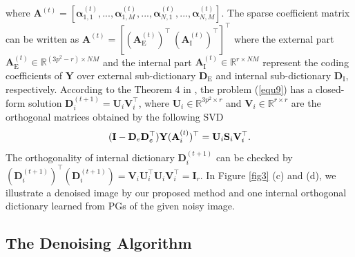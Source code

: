 \documentclass[10pt,twocolumn,letterpaper]{article}
\begin{document}
where $\textbf{A}^{(t)}=[\bm{\alpha}_{1,1}^{(t)},...,\bm{\alpha}_{1,M}^{(t)},...,\bm{\alpha}_{N,1}^{(t)},...,\bm{\alpha}_{N,M}^{(t)}]$. The sparse coefficient matrix can be written as $\mathbf{A}^{(t)}=[(\mathbf{A}_{\text{E}}^{(t)})^{\top}\ (\mathbf{A}_{\text{I}}^{(t)})^{\top}]^{\top}$ where the external part $\mathbf{A}_{\text{E}}^{(t)}\in\mathbb{R}^{(3p^2-r)\times NM}$ and the internal part $\mathbf{A}_{\text{I}}^{(t)}\in\mathbb{R}^{r\times NM}$ represent the coding coefficients of $\mathbf{Y}$ over external sub-dictionary $\mathbf{D}_{\text{E}}$ and internal sub-dictionary $\mathbf{D}_{\text{I}}$, respectively. According to the Theorem 4 in \cite{spca}, the problem (\ref{equ9}) has a closed-form solution $\mathbf{D}_{i}^{(t+1)}=\mathbf{U}_{i}\mathbf{V}_{i}^{\top}$, where $\mathbf{U}_{i}\in\mathbb{R}^{3p^2\times r}$ and $\mathbf{V}_{i}\in\mathbb{R}^{r\times r}$ are the orthogonal matrices obtained by the following SVD
\vspace{-1mm}
\begin{equation}\label{equ10}\vspace{-2mm}
(\mathbf{I}-\mathbf{D}_{e}\mathbf{D}_{e}^{\top})\mathbf{Y}(\mathbf{A}_{i}^{(t)})^{\top}
=
\mathbf{U}_{i}\mathbf{S}_{i}\mathbf{V}_{i}^{\top}.
\end{equation}
The orthogonality of internal dictionary $\mathbf{D}_{i}^{(t+1)}$ can be checked by 
$(\mathbf{D}_{i}^{(t+1)})^{\top}(\mathbf{D}_{i}^{(t+1)})=\mathbf{V}_{i}\mathbf{U}_{i}^{\top}\mathbf{U}_{i}\mathbf{V}_{i}^{\top}=\mathbf{I}_{r}$. In Figure \ref{fig3} (c) and (d), we illustrate a denoised image by our proposed method and one internal orthogonal dictionary learned from PGs of the given noisy image.

\subsection{The Denoising Algorithm}
\end{document}
